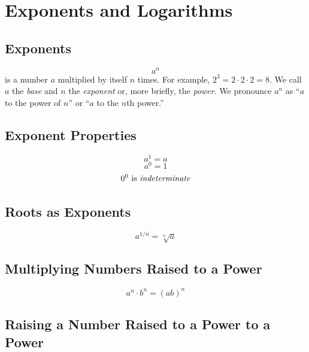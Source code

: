 \section{Exponents and Logarithms}

\subsection{Exponents}

\begin{equation*}
    a^n
\end{equation*}
is a number $a$ multiplied by itself $n$ times. For example, $2^3 = 2 \cdot 2 \cdot 2 = 8$. We call $a$ the \textit{base} and $n$ the \textit{exponent} or, more briefly, 
the \textit{power}. We pronounce $a^n$ as ``$a$ to the power of $n$'' or ``$a$ to the $n$th power.''

\subsection{Exponent Properties}

\begin{equation*}
    a^1 = a 
\end{equation*}
\begin{equation*}
    a^0 = 1
\end{equation*}
\begin{equation*}
    0^0 \text{ is \textit{indeterminate}} 
\end{equation*}

\subsection{Roots as Exponents}

\begin{equation*}
    a^{1/n} = \sqrt[n]{a}
\end{equation*}

\subsection{Multiplying Numbers Raised to a Power}

\begin{equation*}
    a^n \cdot b^n =(ab)^n
\end{equation*}

\subsection{Raising a Number Raised to a Power to a Power}


